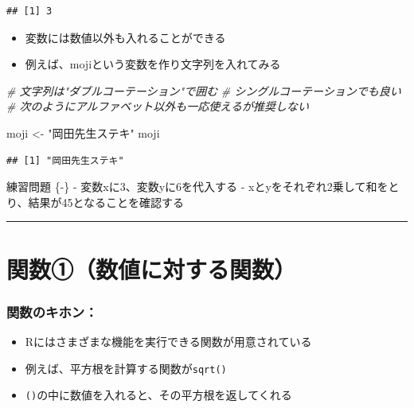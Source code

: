 \documentclass[
]{book}
\newenvironment{Shaded}{\begin{snugshade}}{\end{snugshade}}
\newcommand{\CommentTok}[1]{\textcolor[rgb]{0.56,0.35,0.01}{\textit{#1}}}
\newcommand{\NormalTok}[1]{#1}
\newcommand{\OtherTok}[1]{\textcolor[rgb]{0.56,0.35,0.01}{#1}}
\newcommand{\StringTok}[1]{\textcolor[rgb]{0.31,0.60,0.02}{#1}}
\providecommand{\tightlist}{%
  \setlength{\itemsep}{0pt}\setlength{\parskip}{0pt}}
\begin{document}
\begin{verbatim}
## [1] 3
\end{verbatim}

\begin{itemize}
\tightlist
\item
  変数には数値以外も入れることができる
\item
  例えば、mojiという変数を作り文字列を入れてみる
\end{itemize}

\begin{Shaded}
\begin{Highlighting}[]
\CommentTok{\# 文字列は"ダブルコーテーション"で囲む}
\CommentTok{\# \textquotesingle{}シングルコーテーション\textquotesingle{}でも良い}
\CommentTok{\# 次のようにアルファベット以外も一応使えるが推奨しない}

\NormalTok{moji }\OtherTok{\textless{}{-}} \StringTok{"岡田先生ステキ"}
\NormalTok{moji}
\end{Highlighting}
\end{Shaded}

\begin{verbatim}
## [1] "岡田先生ステキ"
\end{verbatim}

練習問題 \{-\}
- 変数xに3、変数yに6を代入する
- xとyをそれぞれ2乗して和をとり、結果が45となることを確認する

\begin{center}\rule{0.5\linewidth}{0.5pt}\end{center}

\hypertarget{ux95a2ux6570ux2460ux6570ux5024ux306bux5bfeux3059ux308bux95a2ux6570}{%
\section{関数①（数値に対する関数）}\label{ux95a2ux6570ux2460ux6570ux5024ux306bux5bfeux3059ux308bux95a2ux6570}}

\hypertarget{ux95a2ux6570ux306eux30adux30dbux30f3}{%
\subsubsection*{関数のキホン：}\label{ux95a2ux6570ux306eux30adux30dbux30f3}}

\begin{itemize}
\tightlist
\item
  Rにはさまざまな機能を実行できる関数が用意されている
\item
  例えば、平方根を計算する関数が\texttt{sqrt()}
\item
  \texttt{()}の中に数値を入れると、その平方根を返してくれる
\end{itemize}
\end{document}
